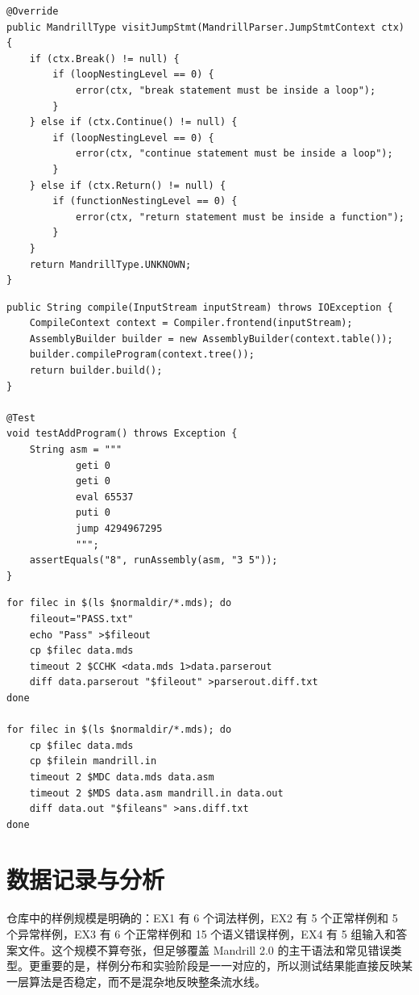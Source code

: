 \documentclass[UTF8,a4paper,12pt]{ctexart}
\begin{document}
\begin{lstlisting}[style=mandrillcode,caption={EX3 语义检查器中的循环和返回约束},label={lst:semantic-code}]
@Override
public MandrillType visitJumpStmt(MandrillParser.JumpStmtContext ctx) {
    if (ctx.Break() != null) {
        if (loopNestingLevel == 0) {
            error(ctx, "break statement must be inside a loop");
        }
    } else if (ctx.Continue() != null) {
        if (loopNestingLevel == 0) {
            error(ctx, "continue statement must be inside a loop");
        }
    } else if (ctx.Return() != null) {
        if (functionNestingLevel == 0) {
            error(ctx, "return statement must be inside a function");
        }
    }
    return MandrillType.UNKNOWN;
}
\end{lstlisting}

\begin{lstlisting}[style=mandrillcode,caption={EX4 编译器入口和端到端测试},label={lst:backend-code}]
public String compile(InputStream inputStream) throws IOException {
    CompileContext context = Compiler.frontend(inputStream);
    AssemblyBuilder builder = new AssemblyBuilder(context.table());
    builder.compileProgram(context.tree());
    return builder.build();
}

@Test
void testAddProgram() throws Exception {
    String asm = """
            geti 0
            geti 0
            eval 65537
            puti 0
            jump 4294967295
            """;
    assertEquals("8", runAssembly(asm, "3 5"));
}
\end{lstlisting}

\begin{lstlisting}[style=mandrillcode,caption={EX2 和 EX4 的批量验证脚本摘录},label={lst:scripts}]
for filec in $(ls $normaldir/*.mds); do
    fileout="PASS.txt"
    echo "Pass" >$fileout
    cp $filec data.mds
    timeout 2 $CCHK <data.mds 1>data.parserout
    diff data.parserout "$fileout" >parserout.diff.txt
done

for filec in $(ls $normaldir/*.mds); do
    cp $filec data.mds
    cp $filein mandrill.in
    timeout 2 $MDC data.mds data.asm
    timeout 2 $MDS data.asm mandrill.in data.out
    diff data.out "$fileans" >ans.diff.txt
done
\end{lstlisting}

\section{数据记录与分析}
仓库中的样例规模是明确的：EX1 有 6 个词法样例，EX2 有 5 个正常样例和 5 个异常样例，EX3 有 6 个正常样例和 15 个语义错误样例，EX4 有 5 组输入和答案文件。这个规模不算夸张，但足够覆盖 Mandrill 2.0 的主干语法和常见错误类型。更重要的是，样例分布和实验阶段是一一对应的，所以测试结果能直接反映某一层算法是否稳定，而不是混杂地反映整条流水线。
\end{document}

